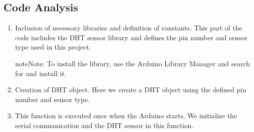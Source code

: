 \documentclass[a4paper,11pt,english]{sphinxmanual}
\begin{document}
\subsection{Code Analysis}
\label{\detokenize{Basic_Project/DHT11_Module:code-analysis}}\begin{enumerate}
%
\item {} 
\sphinxAtStartPar
Inclusion of necessary libraries and definition of constants.
This part of the code includes the DHT sensor library and defines the pin number and sensor type used in this project.

\begin{sphinxadmonition}{note}{Note:}
\sphinxAtStartPar
To install the library, use the Arduino Library Manager and search for  and install it.
\end{sphinxadmonition}

\begin{sphinxVerbatim}[commandchars=\\\{\}]
\end{sphinxVerbatim}

\item {} 
\sphinxAtStartPar
Creation of DHT object.
Here we create a DHT object using the defined pin number and sensor type.

\begin{sphinxVerbatim}[commandchars=\\\{\}]
\end{sphinxVerbatim}

\item {} 
\sphinxAtStartPar
This function is executed once when the Arduino starts. We initialize the serial communication and the DHT sensor in this function.

\begin{sphinxVerbatim}[commandchars=\\\{\}]
\end{sphinxVerbatim}


\end{enumerate}
\end{document}

